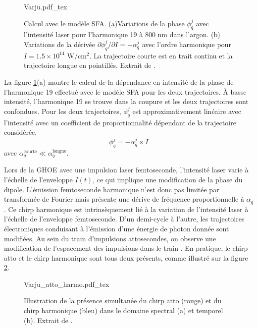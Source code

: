 \begin{figure}[ht]
\centering
\def\svgwidth{\columnwidth}
{Varju.pdf_tex}
\caption{Calcul avec le modèle SFA. (a)Variations de la phase $\phi_q^j$ avec l'intensité laser pour l'harmonique 19 à 800 nm dans l'argon. (b) Variations de la dérivée $\partial \phi_q^j/\partial I = -\alpha_q^j$ avec l'ordre harmonique pour $I = 1.5 \times 10^{14}$ W/cm$^2$. La trajectoire courte est en trait continu et la trajectoire longue en pointillés. Extrait de .}
\label{fig:Varju}
\end{figure}

La figure \ref{fig:Varju}(a) montre le calcul de la dépendance en intensité de la phase de l'harmonique 19 effectué avec le modèle SFA pour les deux trajectoires. \`{A} basse intensité, l'harmonique 19 se trouve dans la coupure et les deux trajectoires sont confondues. Pour les deux trajectoires, $\phi_q^j$ est approximativement linéaire avec l'intensité avec un coefficient de proportionnalité dépendant de la trajectoire considérée,
\begin{equation}
\phi_q^j = - \alpha_q^j \times I
\end{equation}
avec $\alpha_q^{\text{courte}} \ll \alpha_q^{\text{longue}}$. 

Lors de la GHOE avec une impulsion laser femtoseconde, l'intensité laser varie à l'échelle de l'enveloppe $I(t)$, ce qui implique une modification de la phase du dipole. L'émission femtoseconde harmonique n'est donc pas limitée par transformée de Fourier mais présente une dérive de fréquence proportionnelle à $\alpha_q$ . Ce chirp harmonique est intrinsèquement lié à la variation de l'intensité laser à l'échelle de l'enveloppe femtoseconde. D'un demi-cycle à l'autre, les trajectoires électroniques conduisant à l'émission d'une énergie de photon donnée sont modifiées. Au sein du train d'impulsions attosecondes, on observe une modification de l'espacement des impulsions dans le train . En pratique, le chirp atto et le chirp harmonique sont tous deux présents, comme illustré sur la figure \ref{fig:Varju_atto_harmo}.

\begin{figure}
\centering
\def\svgwidth{0.5\columnwidth}
{Varju_atto_harmo.pdf_tex}
\caption{Illustration de la présence simultanée du chirp atto (rouge) et du chirp harmonique (bleu) dans le domaine spectral (a) et temporel (b). Extrait de .}
\label{fig:Varju_atto_harmo}
\end{figure}

